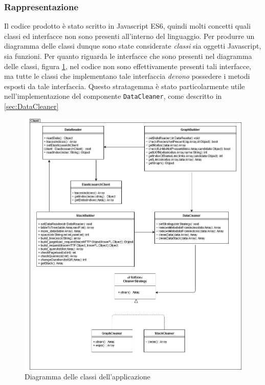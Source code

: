 \subsubsection{Rappresentazione}
Il codice prodotto è stato scritto in Javascript ES6, quindi molti concetti quali classi ed interfacce non sono presenti all'interno del linguaggio. Per produrre un diagramma delle classi dunque sono state considerate \emph{ classi } sia oggetti Javascript, sia funzioni. Per quanto riguarda le interfacce che sono presenti nel diagramma delle classi, figura \ref{img:diagrammaClassiClient}, nel codice non sono effettivamente presenti tali interfacce, ma tutte le classi che implementano tale interfaccia \emph{devono} possedere i metodi esposti da tale interfaccia. Questo stratagemma è stato particolarmente utile nell'implementazione del componente \texttt{DataCleaner}, come descritto in \ref{sec:DataCleaner}

\begin{figure}[H]
    \centering
    \includegraphics[width=1\textwidth]{Images/classi.png}
    \caption{Diagramma delle classi dell'applicazione}
    \label{img:diagrammaClassiClient}
\end{figure}

